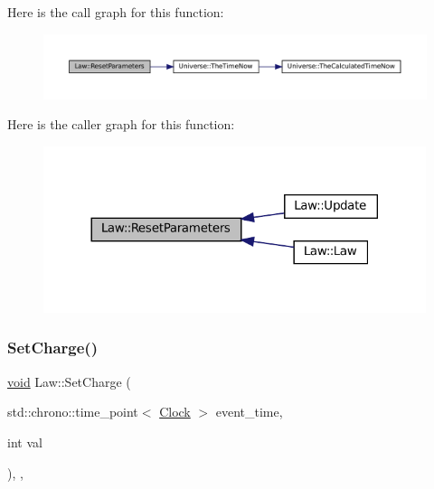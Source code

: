 Here is the call graph for this function\+:\nopagebreak
\begin{figure}[H]
\begin{center}
\leavevmode
\includegraphics[width=350pt]{class_law_a56541ec0b82b8a7c377ae2e6b444205c_cgraph}
\end{center}
\end{figure}
Here is the caller graph for this function\+:\nopagebreak
\begin{figure}[H]
\begin{center}
\leavevmode
\includegraphics[width=317pt]{class_law_a56541ec0b82b8a7c377ae2e6b444205c_icgraph}
\end{center}
\end{figure}
\mbox{\label{class_law_a2e780573f6285f88d167d45a2e243d01}} 
\subsubsection{\texorpdfstring{Set\+Charge()}{SetCharge()}}
{\footnotesize\ttfamily \mbox{\hyperlink{glad_8h_a950fc91edb4504f62f1c577bf4727c29}{void}} Law\+::\+Set\+Charge (\begin{DoxyParamCaption}\item[{std\+::chrono\+::time\+\_\+point$<$ \mbox{\hyperlink{universe_8h_a0ef8d951d1ca5ab3cfaf7ab4c7a6fd80}{Clock}} $>$}]{event\+\_\+time,  }\item[{int}]{val }\end{DoxyParamCaption})\hspace{0.3cm}{\ttfamily [inline]}, {\ttfamily [final]}, {\ttfamily [virtual]}}



